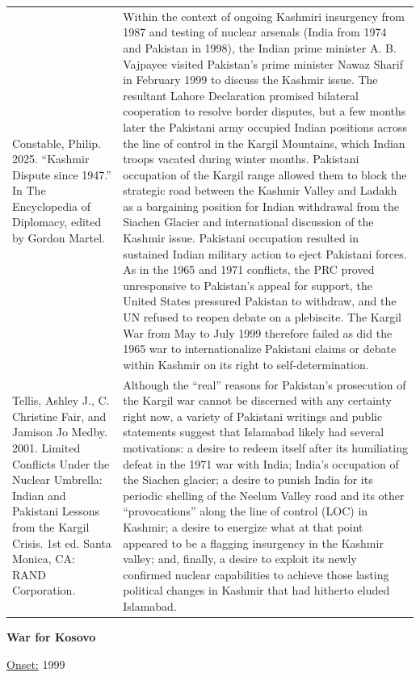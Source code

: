{\begin{longtable}{p{}p{}}
Constable, Philip. 2025. “Kashmir Dispute since 1947.” In The Encyclopedia of Diplomacy, edited by Gordon Martel. &  Within the context of ongoing Kashmiri insurgency from 1987 and testing of nuclear arsenals (India from 1974 and Pakistan in 1998), the Indian prime minister A. B. Vajpayee visited Pakistan's prime minister Nawaz Sharif in February 1999 to discuss the Kashmir issue. The resultant Lahore Declaration promised bilateral cooperation to resolve border disputes, but a few months later the Pakistani army occupied Indian positions across the line of control in the Kargil Mountains, which Indian troops vacated during winter months. Pakistani occupation of the Kargil range allowed them to block the strategic road between the Kashmir Valley and Ladakh as a bargaining position for Indian withdrawal from the Siachen Glacier and international discussion of the Kashmir issue. Pakistani occupation resulted in sustained Indian military action to eject Pakistani forces. As in the 1965 and 1971 conflicts, the PRC proved unresponsive to Pakistan's appeal for support, the United States pressured Pakistan to withdraw, and the UN refused to reopen debate on a plebiscite. The Kargil War from May to July 1999 therefore failed as did the 1965 war to internationalize Pakistani claims or debate within Kashmir on its right to self-determination.
\\
Tellis, Ashley J., C. Christine Fair, and Jamison Jo Medby. 2001. Limited Conflicts Under the Nuclear Umbrella: Indian and Pakistani Lessons from the Kargil Crisis. 1st ed. Santa Monica, CA: RAND Corporation. & Although the “real” reasons for Pakistan's prosecution of the Kargil war cannot be discerned with any certainty right now, a variety of Pakistani writings and public statements suggest that Islamabad likely had several motivations: a desire to redeem itself after its humiliating defeat in the 1971 war with India; India's occupation of the Siachen glacier; a desire to punish India for its periodic shelling of the Neelum Valley road and its other “provocations” along the line of control (LOC) in Kashmir; a desire to energize what at that point appeared to be a flagging insurgency in the Kashmir valley; and, finally, a desire to exploit its newly confirmed nuclear capabilities to achieve those lasting political changes in Kashmir that had hitherto eluded Islamabad.
\\
\end{longtable}}
\clearpage
         \textbf{War for Kosovo} 

          \underline{Onset:} 1999         

